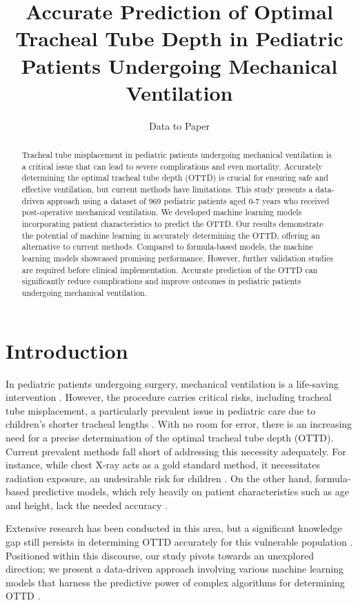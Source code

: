 \documentclass[11pt]{article}
\title{Accurate Prediction of Optimal Tracheal Tube Depth in Pediatric Patients Undergoing Mechanical Ventilation}
\author{Data to Paper}
\begin{document}
\maketitle
\begin{abstract}
Tracheal tube misplacement in pediatric patients undergoing mechanical ventilation is a critical issue that can lead to severe complications and even mortality. Accurately determining the optimal tracheal tube depth (OTTD) is crucial for ensuring safe and effective ventilation, but current methods have limitations. This study presents a data-driven approach using a dataset of 969 pediatric patients aged 0-7 years who received post-operative mechanical ventilation. We developed machine learning models incorporating patient characteristics to predict the OTTD. Our results demonstrate the potential of machine learning in accurately determining the OTTD, offering an alternative to current methods. Compared to formula-based models, the machine learning models showcased promising performance. However, further validation studies are required before clinical implementation. Accurate prediction of the OTTD can significantly reduce complications and improve outcomes in pediatric patients undergoing mechanical ventilation.
\end{abstract}
\section*{Introduction}

In pediatric patients undergoing surgery, mechanical ventilation is a life-saving intervention \cite{Kollef1994EndotrachealTM}. However, the procedure carries critical risks, including tracheal tube misplacement, a particularly prevalent issue in pediatric care due to children's shorter tracheal lengths \cite{Kollef1994EndotrachealTM}. With no room for error, there is an increasing need for a precise determination of the optimal tracheal tube depth (OTTD). Current prevalent methods fall short of addressing this necessity adequately. For instance, while chest X-ray acts as a gold standard method, it necessitates radiation exposure, an undesirable risk for children \cite{Thill2004NoninvasivePV}. On the other hand, formula-based predictive models, which rely heavily on patient characteristics such as age and height, lack the needed accuracy \cite{Ahmad2019DifficultAS}.

Extensive research has been conducted in this area, but a significant knowledge gap still persists in determining OTTD accurately for this vulnerable population \cite{Zhou2022PredictionOE, Rost2022TrachealTM}. Positioned within this discourse, our study pivots towards an unexplored direction; we present a data-driven approach involving various machine learning models that harness the predictive power of complex algorithms for determining OTTD \cite{Nunez2021MachineLP}.
\end{document}
